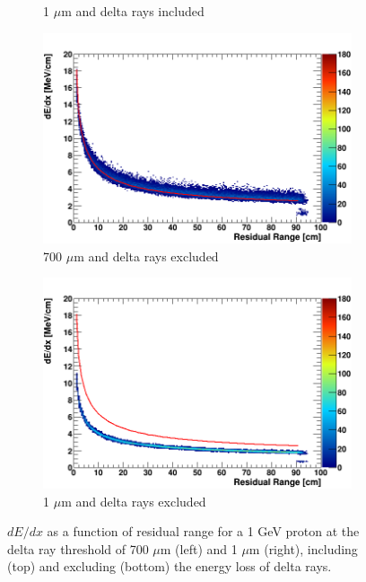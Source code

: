 \begin{figure}[b!]
\begin{subfigure}[b]{0.495\textwidth}
            \caption{1 $\mu$m and delta rays included}%
            \label{fig:derr_proton_delta_1}
        \end{subfigure}
        \begin{subfigure}[b]{0.495\textwidth}   
            \centering 
            \includegraphics[width=\textwidth]{derr_proton_only_700um}
            \caption{700 $\mu$m and delta rays excluded}%
            \label{fig:derr_proton_only_700}
        \end{subfigure}
        \hfill
        \begin{subfigure}[b]{0.495\textwidth}   
            \centering 
            \includegraphics[width=\textwidth]{derr_proton_only_1um}
            \caption{1 $\mu$m and delta rays excluded}%
            \label{fig:derr_proton_only_1}
        \end{subfigure}
	\caption[Energy-Residual Range of Protons at Different Delta Ray Thresholds]{
	$dE/dx$ as a function of residual range for a 1 GeV proton at the delta ray threshold of 700 $\mu$m (left) and 1 $\mu$m (right), including (top) and excluding (bottom) the energy loss of delta rays. 
	}
        \label{fig:proton_derr}
\end{figure}

